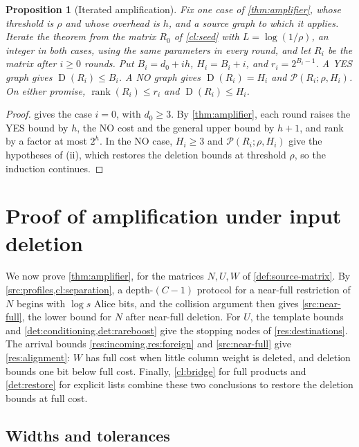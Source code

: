 \documentclass[11pt,letterpaper]{article} \usepackage[utf8]{inputenc}
\theoremstyle{plain} \newtheorem{theorem}{Theorem}[section]
\newtheorem{proposition}[proposition]{Proposition}
\theoremstyle{definition} \newaliascnt{definition}{theorem}
\newcommand{\D}{\operatorname{D}}
\newcommand{\RP}[3]{\mathcal{P}(#1;#2,#3)}
\DeclareMathOperator{\rank}{rank} \crefname{claim}{Claim}{Claims}
\begin{document}
\begin{proposition}[Iterated amplification]\label{prop:iteration}
Fix one case of \cref{thm:amplifier}, whose threshold is $\rho$ and whose
overhead is $h$, and a source graph to which it applies. Iterate the theorem from the
matrix $R_0$ of \cref{cl:seed} with $L=\log(1/\rho)$, an integer in both
cases, using the same
parameters in every round, and let $R_i$ be the matrix after $i\ge0$ rounds.
Put $B_i=d_0+ih$, $H_i=B_i+i$, and $r_i=2^{B_i-1}$. A YES graph
gives $\D(R_i)\le B_i$. A NO graph gives
$\D(R_i)=H_i$ and $\RP{R_i}{\rho}{H_i}$. On either promise,
$\rank(R_i)\le r_i$ and $\D(R_i)\le H_i$.
\end{proposition}
\begin{proof}
 gives the case $i=0$, with $d_0\ge3$. By
\cref{thm:amplifier}, each round raises the YES bound by $h$, the NO cost
and the general upper bound by $h+1$, and rank by a factor at most $2^h$.
In the NO case, $H_i\ge3$ and $\RP{R_i}{\rho}{H_i}$ give the hypotheses of
(ii), which restores the deletion bounds at threshold $\rho$, so
the induction continues.
\end{proof}

\section{Proof of amplification under input deletion}
\label{sec:amplification-proof}

We now prove \cref{thm:amplifier}, for the matrices $N,U,W$ of
\cref{def:source-matrix}. By \cref{src:profiles,cl:separation}, a depth-$(C-1)$
protocol for a near-full restriction of $N$ begins with $\log s$ Alice bits, and the collision argument
then gives \cref{src:near-full}, the lower bound for $N$ after near-full
deletion. For $U$, the template bounds and \cref{det:conditioning,det:rareboost}
give the stopping nodes of \cref{res:destinations}. The arrival bounds
\cref{res:incoming,res:foreign} and \cref{src:near-full} give
\cref{res:alignment}: $W$ has full cost when little column weight is
deleted, and deletion bounds one bit below full cost. Finally, \cref{cl:bridge}
for full products and \cref{det:restore} for explicit lists combine these
two conclusions to restore the deletion bounds at full cost.

\subsection{Widths and tolerances}
\end{document}

